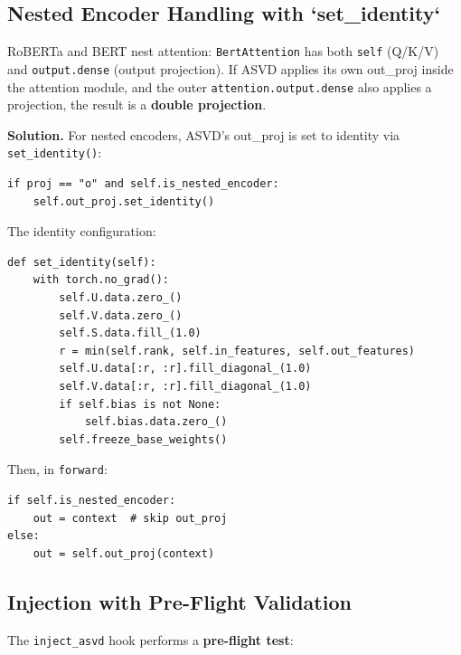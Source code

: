 \subsection{Nested Encoder Handling with `set\_identity`}

RoBERTa and BERT nest attention: \texttt{BertAttention} has both \texttt{self} (Q/K/V) 
and \texttt{output.dense} (output projection). If ASVD applies its own out\_proj 
inside the attention module, and the outer \texttt{attention.output.dense} also 
applies a projection, the result is a \textbf{double projection}.

\textbf{Solution.} For nested encoders, ASVD's out\_proj is set to identity via 
\texttt{set\_identity()}:

\begin{lstlisting}
if proj == "o" and self.is_nested_encoder:
    self.out_proj.set_identity()
\end{lstlisting}

The identity configuration:

\begin{lstlisting}
def set_identity(self):
    with torch.no_grad():
        self.U.data.zero_()
        self.V.data.zero_()
        self.S.data.fill_(1.0)
        r = min(self.rank, self.in_features, self.out_features)
        self.U.data[:r, :r].fill_diagonal_(1.0)
        self.V.data[:r, :r].fill_diagonal_(1.0)
        if self.bias is not None:
            self.bias.data.zero_()
        self.freeze_base_weights()
\end{lstlisting}

Then, in \texttt{forward}:

\begin{lstlisting}
if self.is_nested_encoder:
    out = context  # skip out_proj
else:
    out = self.out_proj(context)
\end{lstlisting}

\subsection{Injection with Pre-Flight Validation}

The \texttt{inject\_asvd} hook performs a \textbf{pre-flight test}:

